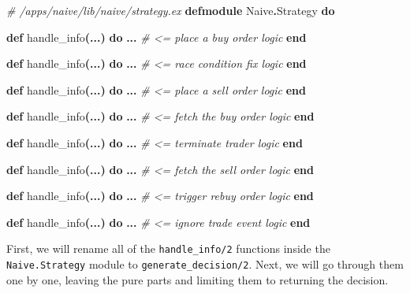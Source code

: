\documentclass[
  oneside]{book}
\newenvironment{Shaded}{\begin{snugshade}}{\end{snugshade}}
\newcommand{\CommentTok}[1]{\textcolor[rgb]{0.56,0.35,0.01}{\textit{#1}}}
\newcommand{\ConstantTok}[1]{\textcolor[rgb]{0.56,0.35,0.01}{#1}}
\newcommand{\FunctionTok}[1]{\textcolor[rgb]{0.13,0.29,0.53}{\textbf{#1}}}
\newcommand{\KeywordTok}[1]{\textcolor[rgb]{0.13,0.29,0.53}{\textbf{#1}}}
\newcommand{\NormalTok}[1]{#1}
\newcommand{\OperatorTok}[1]{\textcolor[rgb]{0.81,0.36,0.00}{\textbf{#1}}}
\begin{document}
\begin{Shaded}
\begin{Highlighting}[]
\CommentTok{\# /apps/naive/lib/naive/strategy.ex}
\KeywordTok{defmodule} \ConstantTok{Naive}\OperatorTok{.}\ConstantTok{Strategy} \KeywordTok{do}

  \KeywordTok{def}\NormalTok{ handle\_info}\FunctionTok{(}\OperatorTok{...}\FunctionTok{)} \KeywordTok{do}
    \OperatorTok{...} \CommentTok{\# \textless{}= place a buy order logic}
  \KeywordTok{end}

  \KeywordTok{def}\NormalTok{ handle\_info}\FunctionTok{(}\OperatorTok{...}\FunctionTok{)} \KeywordTok{do}
    \OperatorTok{...} \CommentTok{\# \textless{}= race condition fix logic}
  \KeywordTok{end}

  \KeywordTok{def}\NormalTok{ handle\_info}\FunctionTok{(}\OperatorTok{...}\FunctionTok{)} \KeywordTok{do}
    \OperatorTok{...} \CommentTok{\# \textless{}= place a sell order logic}
  \KeywordTok{end}

  \KeywordTok{def}\NormalTok{ handle\_info}\FunctionTok{(}\OperatorTok{...}\FunctionTok{)} \KeywordTok{do}
    \OperatorTok{...} \CommentTok{\# \textless{}= fetch the buy order logic}
  \KeywordTok{end}

  \KeywordTok{def}\NormalTok{ handle\_info}\FunctionTok{(}\OperatorTok{...}\FunctionTok{)} \KeywordTok{do}
    \OperatorTok{...} \CommentTok{\# \textless{}= terminate trader logic}
  \KeywordTok{end}

  \KeywordTok{def}\NormalTok{ handle\_info}\FunctionTok{(}\OperatorTok{...}\FunctionTok{)} \KeywordTok{do}
    \OperatorTok{...} \CommentTok{\# \textless{}= fetch the sell order logic}
  \KeywordTok{end}

  \KeywordTok{def}\NormalTok{ handle\_info}\FunctionTok{(}\OperatorTok{...}\FunctionTok{)} \KeywordTok{do}
    \OperatorTok{...} \CommentTok{\# \textless{}= trigger rebuy order logic}
  \KeywordTok{end}

  \KeywordTok{def}\NormalTok{ handle\_info}\FunctionTok{(}\OperatorTok{...}\FunctionTok{)} \KeywordTok{do}
    \OperatorTok{...} \CommentTok{\# \textless{}= ignore trade event logic}
  \KeywordTok{end}
\end{Highlighting}
\end{Shaded}

First, we will rename all of the \texttt{handle\_info/2} functions inside the \texttt{Naive.Strategy} module to \texttt{generate\_decision/2}. Next, we will go through them one by one, leaving the pure parts and limiting them to returning the decision.
\end{document}
